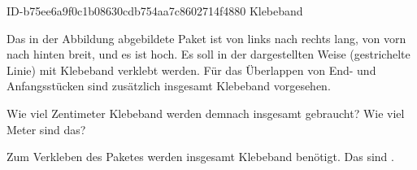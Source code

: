 \begin{exercise}
      {ID-b75ee6a9f0c1b08630cdb754aa7c8602714f4880}
      {Klebeband}
  \ifproblem\problem
    \begin{minipage}{0.33\linewidth}
    \end{minipage}\hfill
    \begin{minipage}{0.65\linewidth}
      Das in der Abbildung abgebildete Paket ist von links nach rechts 
      lang, von vorn nach hinten  breit, und es ist  hoch.
      Es soll in der dargestellten Weise (gestrichelte Linie) mit Klebeband
      verklebt werden. Für das Überlappen von End- und Anfangsstücken sind
      zusätzlich insgesamt  Klebeband vorgesehen.\par
      Wie viel Zentimeter Klebeband werden demnach insgesamt gebraucht?
      Wie viel Meter sind das?
    \end{minipage}
  \fi
  \ifoutcome\outcome
    Zum Verkleben des Paketes werden insgesamt  Klebeband benötigt.
    Das sind .
  \fi
\end{exercise}
